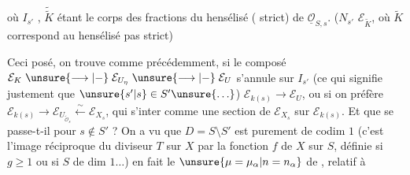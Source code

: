 où $I_{s'}$  , $\widetilde{\widetilde K}$ étant le corps des fractions du hensélisé ( strict) de $\underline{\mathcal O}_{S,s}$. ($N_{s'}$   $\mathcal E_{\widetilde K}$, où $\widetilde K$ correspond au hensélisé pas strict)

Ceci posé, on trouve comme précédemment, si le composé  $\mathcal E_K\mathrel{\unsure{\longrightarrow|-}}\mathcal E_{U_\eta}\mathrel{\unsure{\longrightarrow|-}}\mathcal E_U$ s'annule sur $I_{s'}$   (ce qui signifie justement que $\unsure{s'|s}\in S'\unsure{\ldots}$)   $\mathcal E_{k(s)}\longrightarrow\mathcal E_U$, ou si on préfère $\mathcal E_{k(s)}\longrightarrow\mathcal E_{U_{\widetilde{\mathcal O}_s}}\xleftarrow{\sim}\mathcal E_{X_s}$, qui   s'inter comme une section de $\mathcal E_{X_s}$ sur $\mathcal E_{k(s)}$. Et que se passe-t-il pour $s\notin S'$ ?  On a vu que $D=S\setminus S'$ est purement de codim $1$ (c'est l'image réciproque du diviseur $T$ sur $X$ par la fonction $f$ de $X$ sur $S$, définie si $g\geq1$ ou si $S$ de dim $1\ldots$) en fait le $\unsure{\mu=\mu_\alpha|n=n_\alpha}$ de , relatif à

